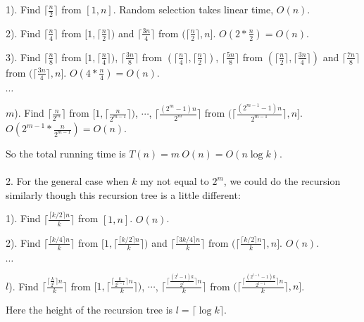 \documentclass[twoside,11pt]{homework}
\begin{document}
1). Find $\lceil \frac{n}{2} \rceil$ from $[1, n]$. 
Random selection takes linear time, $O(n)$.

2). Find $\lceil \frac{n}{4} \rceil$ from $[1, \lceil \frac{n}{2} \rceil )$ and  $\lceil \frac{3n}{4} \rceil$ from $(\lceil \frac{n}{2} \rceil, n]$. 
$O(2 * \frac{n}{2}) = O(n)$.

3). Find $\lceil \frac{n}{8} \rceil$ from $[1, \lceil\frac{n}{4} \rceil )$,  $\lceil \frac{3n}{8} \rceil$ from $(\lceil\frac{n}{4} \rceil, \lceil \frac{n}{2}\rceil)$, $\lceil \frac{5n}{8} \rceil$ from $(\lceil\frac{n}{2}\rceil, \lceil \frac{3n}{4} \rceil)$ and $\lceil \frac{7n}{8} \rceil$ from $(\lceil\frac{3n}{4}\rceil, n]$. 
$O(4 * \frac{n}{4}) = O(n)$.

$\cdots$

$m$). Find $\lceil \frac{n}{2^m} \rceil$ from $[1, \lceil \frac{n}{2^{m-1}}\rceil)$, $\cdots$, $\lceil \frac{(2^m-1)n}{2^m} \rceil$ from $(\lceil \frac{(2^{m-1} - 1) n}{2^{m-1}}\rceil, n]$.
$O(2^{m-1} * \frac{n}{2^{m-1}}) = O(n)$.

\noindent So the total running time is $T(n) = m\ O(n) = O(n \log k)$. 
\\\\
2.
For the general case when $k$ my not equal to $2^m$, we could do the recursion similarly though this recursion tree is a little different:

1). Find $\lceil \frac{\lceil {k/2}\rceil n}{k} \rceil$ from $[1, n]$. 
 $O(n)$.

2). Find $\lceil \frac{\lceil {k/4}\rceil n}{k} \rceil$ from $[1, \lceil \frac{\lceil {k/2}\rceil n}{k} \rceil)$ and  $\lceil \frac{\lceil {3k/4}\rceil n}{k} \rceil$ from $(\lceil \frac{\lceil {k/2}\rceil n}{k} \rceil, n]$. 
$O(n)$.


$\cdots$

$l$). Find $\lceil \frac{\lceil \frac{k}{2^l}\rceil n }{k} \rceil$ from $[1, \lceil \frac{\lceil \frac{k}{2^{l-1}}\rceil n}{k}\rceil)$, $\cdots$, $\lceil \frac{\lceil \frac{(2^l - 1)k}{2^l}\rceil n}{k} \rceil$ from $(\lceil \frac{\lceil \frac{(2^{l-1} - 1)k}{2^{l-1}}\rceil n}{k} \rceil, n]$.

Here the height of the recursion tree is $l = \lceil \log k \rceil$.
\end{document}
